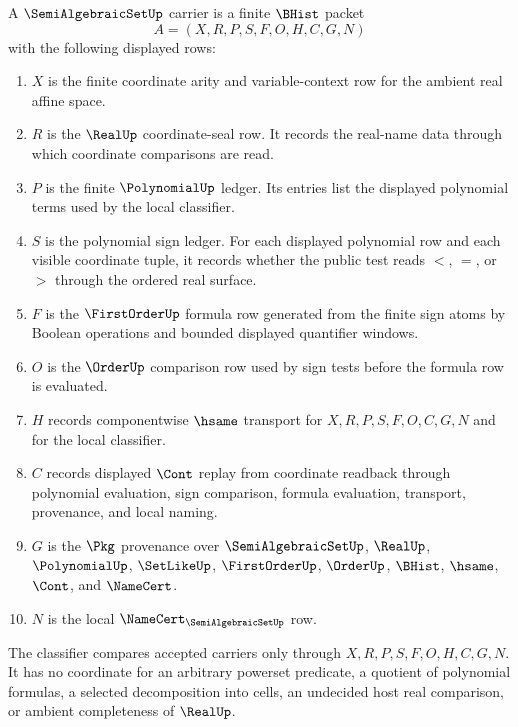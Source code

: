 \begin{definition}
\label{def:semi-algebraic-set-carrier}
A $\SemiAlgebraicSetUp$ carrier is a finite $\BHist$ packet
$$
A=(X,R,P,S,F,O,H,C,G,N)
$$
with the following displayed rows:
\begin{enumerate}
\item $X$ is the finite coordinate arity and variable-context row for the ambient real affine space.
\item $R$ is the $\RealUp$ coordinate-seal row. It records the real-name data through which coordinate comparisons are read.
\item $P$ is the finite $\PolynomialUp$ ledger. Its entries list the displayed polynomial terms used by the local classifier.
\item $S$ is the polynomial sign ledger. For each displayed polynomial row and each visible coordinate tuple, it records whether the public test reads $<$, $=$, or $>$ through the ordered real surface.
\item $F$ is the $\FirstOrderUp$ formula row generated from the finite sign atoms by Boolean operations and bounded displayed quantifier windows.
\item $O$ is the $\OrderUp$ comparison row used by sign tests before the formula row is evaluated.
\item $H$ records componentwise $\hsame$ transport for $X,R,P,S,F,O,C,G,N$ and for the local classifier.
\item $C$ records displayed $\Cont$ replay from coordinate readback through polynomial evaluation, sign comparison, formula evaluation, transport, provenance, and local naming.
\item $G$ is the $\Pkg$ provenance over $\SemiAlgebraicSetUp$, $\RealUp$, $\PolynomialUp$, $\SetLikeUp$, $\FirstOrderUp$, $\OrderUp$, $\BHist$, $\hsame$, $\Cont$, and $\NameCert$.
\item $N$ is the local $\NameCert_{\SemiAlgebraicSetUp}$ row.
\end{enumerate}
The classifier compares accepted carriers only through $X,R,P,S,F,O,H,C,G,N$. It has no coordinate for an arbitrary powerset predicate, a quotient of polynomial formulas, a selected decomposition into cells, an undecided host real comparison, or ambient completeness of $\RealUp$.
\end{definition}


